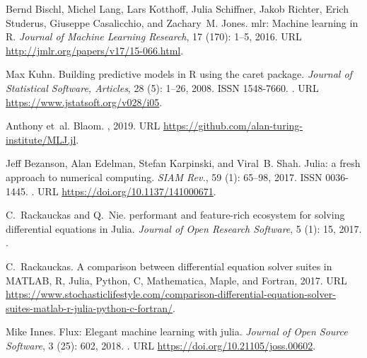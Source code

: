 \documentclass{article}
\begin{document}
\begin{thebibliography}{18}
Bernd Bischl, Michel Lang, Lars Kotthoff, Julia Schiffner, Jakob Richter, Erich
  Studerus, Giuseppe Casalicchio, and Zachary~M. Jones.
\newblock mlr: Machine learning in {R}.
\newblock \emph{Journal of Machine Learning Research}, 17
  (170): 1--5, 2016.
\newblock URL \url{http://jmlr.org/papers/v17/15-066.html}.

Max Kuhn.
\newblock Building predictive models in {R} using the caret package.
\newblock \emph{Journal of Statistical Software, Articles}, 28
  (5): 1--26, 2008.
\newblock ISSN 1548-7660.
\newblock {}.
\newblock URL \url{https://www.jstatsoft.org/v028/i05}.

Anthony et~al. Blaom.
, 2019.
\newblock URL \url{https://github.com/alan-turing-institute/MLJ.jl}.

Jeff Bezanson, Alan Edelman, Stefan Karpinski, and Viral~B. Shah.
\newblock Julia: a fresh approach to numerical computing.
\newblock \emph{SIAM Rev.}, 59 (1): 65--98, 2017.
\newblock ISSN 0036-1445.
\newblock {}.
\newblock URL \url{https://doi.org/10.1137/141000671}.

C.~Rackauckas and Q.~Nie.
 performant and feature-rich
  ecosystem for solving differential equations in {J}ulia.
\newblock \emph{Journal of Open Research Software}, 5 (1):
  15, 2017.
\newblock {}.

C.~Rackauckas.
\newblock A comparison between differential equation solver suites in {MATLAB},
  {R}, {J}ulia, {P}ython, {C}, {M}athematica, {M}aple, and {F}ortran, 2017.
\newblock URL
  \url{https://www.stochasticlifestyle.com/comparison-differential-equation-solver-suites-matlab-r-julia-python-c-fortran/}.

Mike Innes.
\newblock Flux: Elegant machine learning with julia.
\newblock \emph{Journal of Open Source Software}, 3 (25):
  602, 2018.
\newblock {}.
\newblock URL \url{https://doi.org/10.21105/joss.00602}.


\end{thebibliography}
\end{document}
